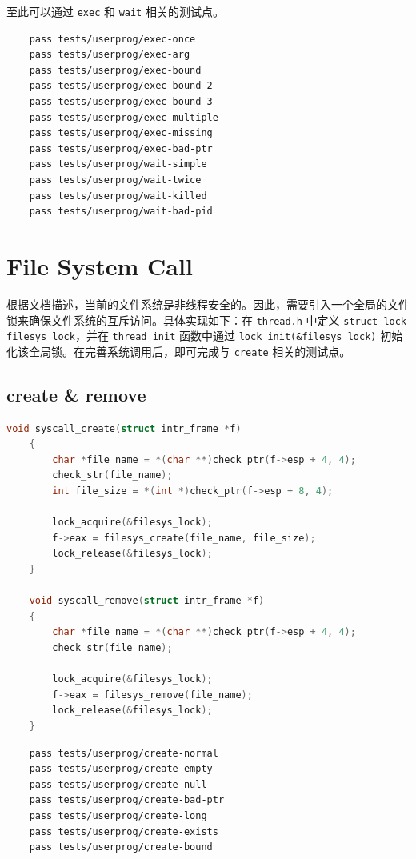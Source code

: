 \documentclass{article}
\begin{document}
至此可以通过 \texttt{exec} 和 \texttt{wait} 相关的测试点。

\begin{lstlisting}
	pass tests/userprog/exec-once
	pass tests/userprog/exec-arg
	pass tests/userprog/exec-bound
	pass tests/userprog/exec-bound-2
	pass tests/userprog/exec-bound-3
	pass tests/userprog/exec-multiple
	pass tests/userprog/exec-missing
	pass tests/userprog/exec-bad-ptr
	pass tests/userprog/wait-simple
	pass tests/userprog/wait-twice
	pass tests/userprog/wait-killed
	pass tests/userprog/wait-bad-pid
\end{lstlisting}

\section{File System Call}

根据文档描述，当前的文件系统是非线程安全的。因此，需要引入一个全局的文件锁来确保文件系统的互斥访问。具体实现如下：在 \texttt{thread.h} 中定义 \texttt{struct lock filesys\_lock}，并在 \texttt{thread\_init} 函数中通过 \texttt{lock\_init(\&filesys\_lock)} 初始化该全局锁。在完善系统调用后，即可完成与 \texttt{create} 相关的测试点。

\subsection{create \& remove}

\begin{lstlisting}[language=C]
	void syscall_create(struct intr_frame *f)
	{
		char *file_name = *(char **)check_ptr(f->esp + 4, 4);
		check_str(file_name);
		int file_size = *(int *)check_ptr(f->esp + 8, 4);
		
		lock_acquire(&filesys_lock);
		f->eax = filesys_create(file_name, file_size);
		lock_release(&filesys_lock);
	}
	
	void syscall_remove(struct intr_frame *f)
	{
		char *file_name = *(char **)check_ptr(f->esp + 4, 4);
		check_str(file_name);
		
		lock_acquire(&filesys_lock);
		f->eax = filesys_remove(file_name);
		lock_release(&filesys_lock);
	}
\end{lstlisting}

\begin{lstlisting}
	pass tests/userprog/create-normal
	pass tests/userprog/create-empty
	pass tests/userprog/create-null
	pass tests/userprog/create-bad-ptr
	pass tests/userprog/create-long
	pass tests/userprog/create-exists
	pass tests/userprog/create-bound
\end{lstlisting}
\end{document}
